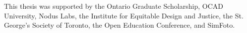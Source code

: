 
This thesis was supported by the Ontario Graduate Scholarship, OCAD University, Nodus Labs, the Institute for Equitable Design and Justice, the St. George’s Society of Toronto, the Open Education Conference, and SimFoto.